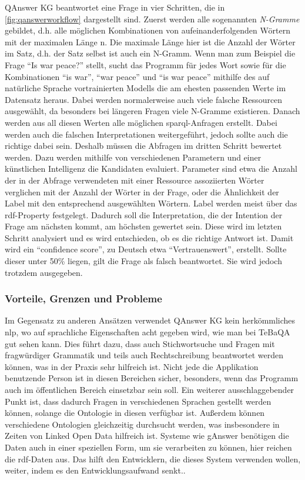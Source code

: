 QAnswer KG beantwortet eine Frage in vier Schritten, die in \cref{fig:qanswerworkflow} dargestellt sind.
Zuerst werden alle sogenannten \emph{N-Gramme} gebildet, d.h. alle möglichen Kombinationen von aufeinanderfolgenden Wörtern mit der maximalen Länge n.
Die maximale Länge hier ist die Anzahl der Wörter im Satz, d.h. der Satz selbst ist auch ein N-Gramm.
Wenn man zum Beispiel die Frage \enquote{Is war peace?} stellt,
sucht das Programm für jedes Wort sowie für die Kombinationen \enquote{is war}, \enquote{war peace} und \enquote{is war peace}
mithilfe des auf natürliche Sprache vortrainierten Modells die am ehesten passenden Werte im Datensatz heraus.
Dabei werden normalerweise auch viele falsche Ressourcen ausgewählt, da besonders bei längeren Fragen viele N-Gramme existieren.
Danach werden aus all diesen Werten alle möglichen \ac{sparql}-Anfragen erstellt.
Dabei werden auch die falschen Interpretationen weitergeführt, jedoch sollte auch die richtige dabei sein.
Deshalb müssen die Abfragen im dritten Schritt bewertet werden.
Dazu werden mithilfe von verschiedenen Parametern und einer künstlichen Intelligenz die Kandidaten evaluiert.
Parameter sind etwa die Anzahl der in der Abfrage verwendeten mit einer Ressource assoziierten Wörter verglichen mit der Anzahl der Wörter in der Frage,
oder die Ähnlichkeit der Label mit den entsprechend ausgewählten Wörtern.
Label werden meist über das \ac{rdf}-Property  festgelegt.
Dadurch soll die Interpretation, die der Intention der Frage am nächsten kommt, am höchsten gewertet sein.
Diese wird im letzten Schritt analysiert und es wird entschieden, ob es die richtige Antwort ist.
Damit wird ein \enquote{confidence score}, zu Deutsch etwa \enquote{Vertrauenswert}, erstellt.
Sollte dieser unter 50\% liegen, gilt die Frage als falsch beantwortet.
Sie wird jedoch trotzdem ausgegeben.

\subsubsection{Vorteile, Grenzen und Probleme}

Im Gegensatz zu anderen Ansätzen verwendet QAnswer KG kein herkömmliches \ac{nlp}, wo auf sprachliche Eigenschaften acht gegeben wird, wie man bei TeBaQA gut sehen kann.
Dies führt dazu, dass auch Stichwortsuche und Fragen mit fragwürdiger Grammatik und teils auch Rechtschreibung beantwortet werden können, was in der Praxis sehr hilfreich ist.
Nicht jede die Applikation benutzende Person ist in diesen Bereichen sicher, besonders, wenn das Programm auch im öffentlichen Bereich einsetzbar sein soll.
Ein weiterer ausschlaggebender Punkt ist, dass dadurch Fragen in verschiedenen Sprachen gestellt werden können, solange die Ontologie in diesen verfügbar ist.
Außerdem können verschiedene Ontologien gleichzeitig durchsucht werden, was insbesondere in Zeiten von Linked Open Data hilfreich ist.
Systeme wie gAnswer benötigen die Daten auch in einer speziellen Form, um sie verarbeiten zu können, hier reichen die \ac{rdf}-Daten aus.
Das hilft den Entwicklern, die dieses System verwenden wollen, weiter, indem es den Entwicklungsaufwand senkt..

